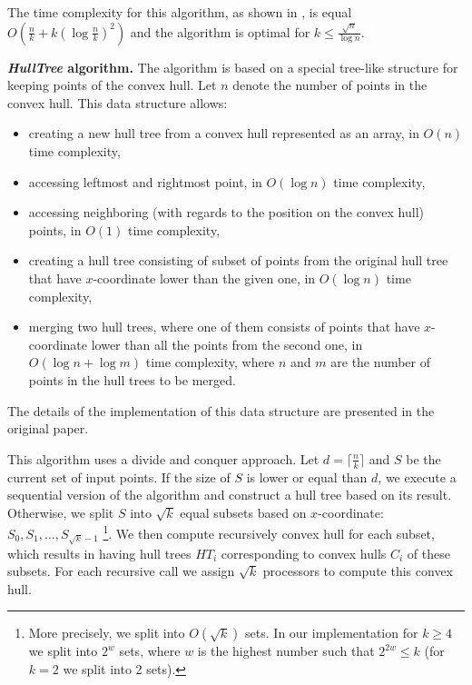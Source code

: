 \documentclass[letterpaper]{article}
\newcommand{\mypar}[1]{{\bf #1.}}
\theoremstyle{definition}
\begin{document}
The time complexity for this algorithm, as shown in \cite{SimpleParallel}, is equal $O(\frac{n}{k} + k(\log \frac{n}{k})^2)$ and the algorithm is optimal for $k \leq \frac{\sqrt{n}}{\log n}$.

\mypar{{\it HullTree} algorithm}
The algorithm is based on a special tree-like structure for keeping points of the convex hull.
Let $n$ denote the number of points in the convex hull.
This data structure allows:
\begin{itemize}
\item creating a new hull tree from a convex hull represented as an array, in $O(n)$ time complexity,
\item accessing leftmost and rightmost point, in $O(\log n)$ time complexity,
\item accessing neighboring (with regards to the position on the convex hull) points, in $O(1)$ time complexity,
\item creating a hull tree consisting of subset of points from the original hull tree that have $x$-coordinate lower than the given one, in $O(\log n)$ time complexity,
\item merging two hull trees, where one of them consists of points that have $x$-coordinate lower than all the points from the second one, in $O(\log n + \log m)$ time complexity, where $n$ and $m$ are the number of points in the hull trees to be merged.
\end{itemize}
The details of the implementation of this data structure are presented in the original paper.

This algorithm uses a divide and conquer approach. 
Let $d = \lceil\frac{n}{k}\rceil$ and $S$ be the current set of input points.
If the size of $S$ is lower or equal than $d$, we execute a sequential version of the algorithm and construct a hull tree based on its result.
Otherwise, we split $S$ into $\sqrt{k}$ equal subsets based on $x$-coordinate: $S_0, S_1, ..., S_{\sqrt{k} - 1}$
\footnote{More precisely, we split into $O(\sqrt k)$ sets. In our implementation for $k \geq 4$ we split into $2^w$ sets, where $w$ is the highest number such that $2^{2w} \leq k$ (for $k = 2$ we split into 2 sets).}.
We then compute recursively convex hull for each subset, which results in having hull trees $HT_i$ corresponding to convex hulls $C_i$ of these subsets.
For each recursive call we assign $\sqrt{k}$ processors to compute this convex hull.
\end{document}
